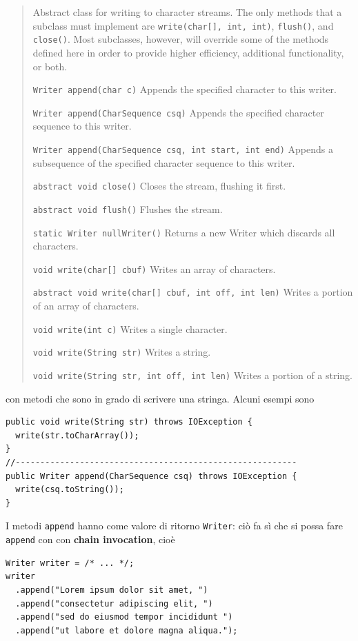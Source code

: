 \documentclass[\fontsizeclass,twocolumn]{\classname}
\theoremstyle{definition}
\theoremstyle{definition}
\begin{document}
\begin{quote}
    \footnotesize{Abstract class for writing to character streams. The only
        methods that a subclass must implement are \texttt{write(char[], int, int)},
        \texttt{flush()}, and \texttt{close()}. Most subclasses, however, will override some of the
methods defined here in order to provide higher efficiency, additional
functionality, or both.

\texttt{Writer 	append(char c)} 	Appends the specified character to this writer.

\texttt{Writer 	append(CharSequence csq)} 	Appends the specified character sequence to this writer.

\texttt{Writer 	append(CharSequence csq, int start, int end)} 	Appends a subsequence of the specified character sequence to this writer.

\texttt{abstract void 	close()} 	Closes the stream, flushing it first.

\texttt{abstract void 	flush()} 	Flushes the stream.

\texttt{static Writer 	nullWriter()} 	Returns a new Writer which discards all characters.

\texttt{void 	write(char[] cbuf)} 	Writes an array of characters.

\texttt{abstract void 	write(char[] cbuf, int off, int len)} 	Writes a portion of an array of characters.

\texttt{void 	write(int c)} 	Writes a single character.

\texttt{void 	write(String str)} 	Writes a string.

\texttt{void 	write(String str, int off, int len)} 	Writes a portion of a string.}
\end{quote}

con metodi che sono in grado di scrivere una stringa. Alcuni esempi sono


\begin{lstlisting}
public void write(String str) throws IOException {
  write(str.toCharArray());
}
//---------------------------------------------------------
public Writer append(CharSequence csq) throws IOException {
  write(csq.toString());
}
\end{lstlisting}

I metodi \texttt{append} hanno come valore di ritorno \texttt{Writer}: ciò fa
sì che si possa fare \texttt{append} con con \textbf{chain invocation}, cioè

\begin{lstlisting}
Writer writer = /* ... */;
writer
  .append("Lorem ipsum dolor sit amet, ")
  .append("consectetur adipiscing elit, ")
  .append("sed do eiusmod tempor incididunt ")
  .append("ut labore et dolore magna aliqua.");
\end{lstlisting}
\end{document}
